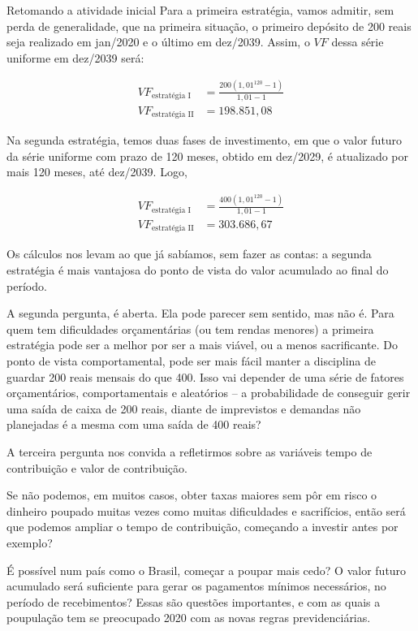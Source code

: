 \begin{example}{Retomando a atividade inicial}
Para a primeira estratégia, vamos admitir, sem perda de generalidade, que na primeira situação, o primeiro depósito de 200 reais seja realizado em jan/2020 e o último em dez/2039. Assim, o $VF$ dessa série uniforme em dez/2039 será: 


\begin{align*}
VF_{\text{estratégia I}}&=\frac{200(1,01^{120}-1)}{1,01-1}\\
VF_{\text{estratégia II}}&=198.851,08
\end{align*}

Na segunda estratégia, temos duas fases de investimento, em que o valor futuro da série uniforme com prazo de 120 meses, obtido em dez/2029, é atualizado por mais 120 meses, até dez/2039. Logo, 

\begin{align*}
VF_{\text{estratégia I}}&=\frac{400(1,01^{120}-1)}{1,01-1}\\
VF_{\text{estratégia II}}&=303.686,67
\end{align*}

Os cálculos nos levam ao que já sabíamos, sem fazer as contas: a segunda estratégia é mais vantajosa do ponto de vista do valor acumulado ao final do período.

A segunda pergunta, é aberta. Ela pode parecer sem sentido, mas não é. Para quem tem dificuldades orçamentárias (ou tem rendas menores) a primeira estratégia pode ser a melhor por ser a mais viável, ou a menos sacrificante. Do ponto de vista comportamental, pode ser mais fácil manter a disciplina de guardar 200 reais mensais do que 400. Isso vai depender de uma série de fatores orçamentários, comportamentais e aleatórios – a probabilidade de conseguir gerir uma saída de caixa de 200 reais, diante de imprevistos e demandas não planejadas é a mesma com uma saída de 400 reais?

A terceira pergunta nos convida a refletirmos sobre as variáveis tempo de contribuição e valor de contribuição. 
\end{example}

Se não podemos, em muitos casos, obter taxas maiores sem pôr em risco o dinheiro poupado muitas vezes como muitas dificuldades e sacrifícios, então será que podemos ampliar o tempo de contribuição, começando a investir antes por exemplo? 

É possível num país como o Brasil, começar a poupar mais cedo? O valor futuro acumulado será suficiente para gerar os pagamentos mínimos necessários, no período de recebimentos? Essas são questões importantes, e com as quais a poupulação tem se preocupado 2020 com as novas regras previdenciárias.

